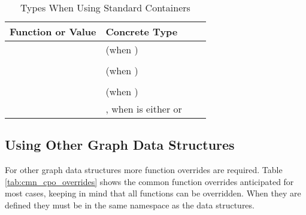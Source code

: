 \begin{table}[h!]
    \begin{center}
    \resizebox{\textwidth}{!}
    {\begin{tabular}{l l p{1.5cm} L{7.0cm}}
    \hline
        \textbf{Function or Value} & \textbf{Concrete Type} \\
    \hline
         &  (when ) \\
         &  & \\
         &  (when ) \\
         &  & \\
         &  (when ) \\
         & , when  is either   or  \\
    \hline
    \end{tabular}}
    \caption{Types When Using Standard Containers}
    \label{tab:simple_graph}
    \end{center}
\end{table}


\subsection{Using Other Graph Data Structures}
For other graph data structures more function overrides are required. Table \ref{tab:cmn_cpo_overrides} shows the 
common function overrides anticipated for most cases, keeping in mind that all functions can be overridden.
When they are defined they must be in the same namespace as the data structures.


